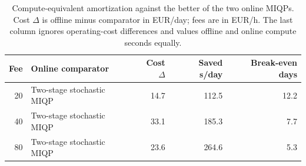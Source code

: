 \begin{table}[ht]
\centering
\small
\caption{Descriptive solver-budget sensitivity at 80 EUR/h. Costs and cost changes are in EUR/day; latency is mean controller-call time. The primary deployment budget is 5 s. Finite gap is the availability fraction; mean gaps are conditional on availability.}
\label{tab:supp-budget}
\end{table}

\begin{table}[ht]
\centering
\small
\caption{Restart and measured offline-computation diagnostics. Fees are in EUR/h; cost ranges and standard deviations are in EUR/day. Offline time is in minutes per five-restart batch.}
\label{tab:supp-restarts}
\end{table}

\begin{table}[ht]
\centering
\small
\caption{Compute-equivalent amortization against the better of the two online MIQPs. Cost $\Delta$ is offline minus comparator in EUR/day; fees are in EUR/h. The last column ignores operating-cost differences and values offline and online compute seconds equally.}
\label{tab:supp-amortization}
\begin{tabularx}{\linewidth}{r>{\raggedright\arraybackslash}Xrrr}
\toprule
Fee & Online comparator & Cost $\Delta$ & Saved s/day & Break-even days \\
\midrule
20 & Two-stage stochastic MIQP & 14.7 & 112.5 & 12.2 \\
40 & Two-stage stochastic MIQP & 33.1 & 185.3 & 7.7 \\
80 & Two-stage stochastic MIQP & 23.6 & 264.6 & 5.3 \\
\bottomrule
\end{tabularx}
\end{table}

